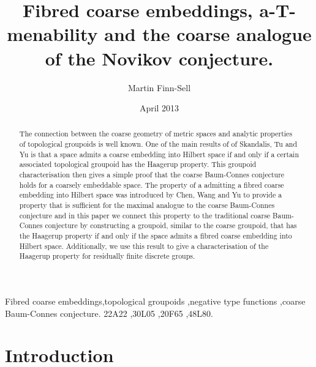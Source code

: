 \documentclass[preprint]{elsarticle}
\theoremstyle{plain}
\theoremstyle{definition}%
\theoremstyle{remark}%
\begin{document}
\title{Fibred coarse embeddings, a-T-menability and the coarse analogue of the Novikov conjecture.} 
\date{April 2013}
\author[UoS]{Martin Finn-Sell}
\address[UoS]{School of Mathematics, University of Southampton, Southampton, SO17 1BJ, United Kingdom}



\begin{abstract}
The connection between the coarse geometry of metric spaces and analytic properties of topological groupoids is well known. One of the main results of of Skandalis, Tu and Yu is that a space admits a coarse embedding into Hilbert space if and only if a certain associated topological groupoid has the Haagerup property. This groupoid characterisation then gives a simple proof that the coarse Baum-Connes conjecture holds for a coarsely embeddable space. The property of a admitting a fibred coarse embedding into Hilbert space was introduced by Chen, Wang and Yu to provide a property that is sufficient for the maximal analogue to the coarse Baum-Connes conjecture and in this paper we connect this property to the traditional coarse Baum-Connes conjecture by constructing a groupoid, similar to the coarse groupoid, that has the Haagerup property if and only if the space admits a fibred coarse embedding into Hilbert space. Additionally, we use this result to give a characterisation of the Haagerup property for residually finite discrete groups.
\end{abstract}

\begin{keyword}
Fibred coarse embeddings\sep topological groupoids \sep negative type functions \sep coarse Baum-Connes conjecture.
\MSC[2010] 22A22 \sep 30L05 \sep 20F65 \sep 48L80.
\end{keyword}

\maketitle

\section{Introduction}
\end{document}
